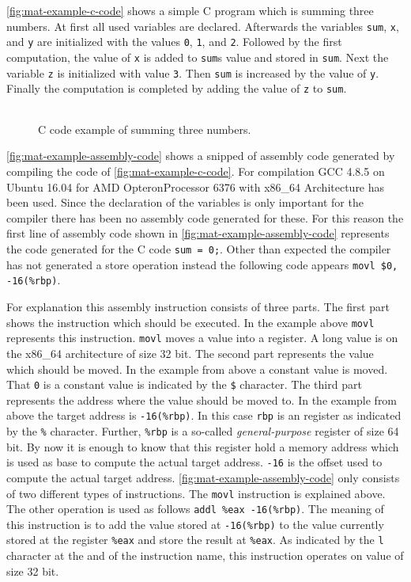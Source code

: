 \documentclass[onecolumn, openany, master, english, seal, signatures]{dbrgrptt}
\begin{document}
\autoref{fig:mat-example-c-code} shows a simple C program which is summing three numbers. At first all used variables are declared. Afterwards the variables \texttt{sum}, \texttt{x}, and \texttt{y} are initialized with the values \texttt{0}, \texttt{1}, and \texttt{2}. Followed by the first computation, the value of \texttt{x} is added to \texttt{sum}s value and stored in \texttt{sum}. Next the variable \texttt{z} is initialized with value \texttt{3}. Then \texttt{sum} is increased by the value of \texttt{y}. Finally the computation is completed by adding the value of \texttt{z} to \texttt{sum}.

\begin{figure}[h!]
  \centering
  \begin{tabular}{c}
  
  \end{tabular}
  \caption{C code example of summing three numbers.}
  \label{fig:mat-example-c-code}
\end{figure}

\autoref{fig:mat-example-assembly-code} shows a snipped of assembly code generated by compiling the code of \autoref{fig:mat-example-c-code}. For compilation GCC 4.8.5 on Ubuntu 16.04 for AMD Opteron\texttrademark Processor 6376 with x86\_64 Architecture has been used. Since the declaration of the variables is only important for the compiler there has been no assembly code generated for these. For this reason the first line of assembly code shown in \autoref{fig:mat-example-assembly-code} represents the code generated for the C code \texttt{sum = 0;}. Other than expected the compiler has not generated a store operation instead the following code appears \texttt{movl \$0, -16(\%rbp)}.

For explanation this assembly instruction consists of three parts. The first part shows the instruction which should be executed. In the example above \texttt{movl} represents this instruction. \texttt{movl} moves a  value into a register. A long value is on the x86\_64 architecture of size 32 bit. The second part represents the value which should be moved. In the example from above a constant value is moved. That \texttt{0} is a constant value is indicated by the \texttt{\$} character. The third part represents the address where the value should be moved to. In the example from above the target address is \texttt{-16(\%rbp)}. In this case \texttt{rbp} is an register as indicated by the \texttt{\%} character. Further, \texttt{\%rbp} is a so-called \emph{general-purpose} register of size 64 bit. By now it is enough to know that this register hold a memory address which is used as base to compute the actual target address. \texttt{-16} is the offset used to compute the actual target address.
\autoref{fig:mat-example-assembly-code} only consists of two different types of instructions. The \texttt{movl} instruction is explained above. The other operation is used as follows \texttt{addl \%eax -16(\%rbp)}. The meaning of this instruction is to add the value stored at \texttt{-16(\%rbp)} to the value currently stored at the register \texttt{\%eax} and store the result at \texttt{\%eax}. As indicated by the \texttt{l} character at the and of the instruction name, this instruction operates on value of size 32 bit.
\end{document}
